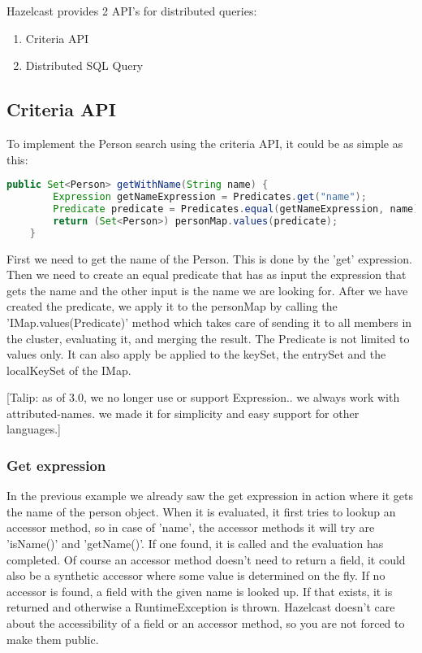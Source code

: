 Hazelcast provides 2 API's for distributed queries:
\begin{enumerate}
\item Criteria API
\item Distributed SQL Query
\end{enumerate}

\subsection*{Criteria API}
To implement the Person search using the criteria API, it could be as simple as this:
\begin{lstlisting}[language=java]
    public Set<Person> getWithName(String name) {
        Expression getNameExpression = Predicates.get("name");
        Predicate predicate = Predicates.equal(getNameExpression, name);
        return (Set<Person>) personMap.values(predicate);
    }
\end{lstlisting}
First we need to get the name of the Person. This is done by the 'get' expression. Then we need to create an equal predicate that has as input the expression that gets the name and the other input is the name we are looking for. After we have created the predicate, we apply it to the personMap by calling the 'IMap.values(Predicate)' method which takes care of sending it to all members in the cluster, evaluating it, and merging the result. The Predicate is not limited to values only. It can also apply be applied to the keySet, the entrySet and the localKeySet of the IMap. 

[Talip: as of 3.0, we no longer use or support Expression.. we always work with attributed-names. we made it for simplicity and easy support for other languages.]
\subsubsection*{Get expression}
In the previous example we already saw the get expression in action where it gets the name of the person object. When it is evaluated, it first tries to lookup an accessor method, so in case of 'name', the accessor methods it will try are 'isName()' and 'getName()'. If one found, it is called and the evaluation has completed. Of course an accessor method doesn't need to return a field, it could also be a synthetic accessor where some value is determined on the fly. If no accessor is found, a field with the given name is looked up. If that exists, it is returned and otherwise a RuntimeException is thrown. Hazelcast doesn't care about the accessibility of a field or an accessor method, so you are not forced to make them public.

